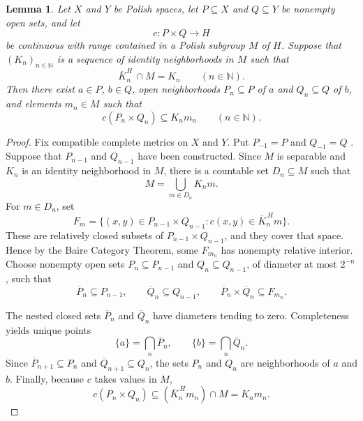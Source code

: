 \documentclass[12pt]{amsart}
\newtheorem{lemma}[theorem]{Lemma}
\theoremstyle{definition}
\begin{document}
\begin{lemma}
\label{Lemma:rectangular-fusion} Let $X$ and $Y$ be Polish spaces, let $%
P\subseteq X$ and $Q\subseteq Y$ be nonempty open sets, and let 
\begin{equation*}
c:P\times Q\longrightarrow H
\end{equation*}%
be continuous with range contained in a Polish subgroup $M$ of $H$. Suppose
that $(K_{n})_{n\in \mathbb{N}}$ is a sequence of identity neighborhoods in $%
M$ such that 
\begin{equation*}
\overline{K}_{n}^{H}\,\cap M=K_{n}\qquad (n\in \mathbb{N}).
\end{equation*}%
Then there exist $a\in P$, $b\in Q$, open neighborhoods $P_{n}\subseteq P$
of $a$ and $Q_{n}\subseteq Q$ of $b$, and elements $m_{n}\in M$ such that 
\begin{equation*}
c(P_{n}\times Q_{n})\subseteq K_{n}m_{n}\qquad (n\in \mathbb{N}).
\end{equation*}
\end{lemma}

\begin{proof}
Fix compatible complete metrics on $X$ and $Y$. Put $P_{-1}=P$ and $Q_{-1}=Q$%
. Suppose that $P_{n-1}$ and $Q_{n-1}$ have been constructed. Since $M$ is
separable and $K_{n}$ is an identity neighborhood in $M$, there is a
countable set $D_{n}\subseteq M$ such that 
\begin{equation*}
M=\bigcup_{m\in D_{n}}K_{n}m.
\end{equation*}%
For $m\in D_{n}$, set 
\begin{equation*}
F_{m}=\{(x,y)\in P_{n-1}\times Q_{n-1}:c(x,y)\in \overline{K}_{n}^{\,H}m\}.
\end{equation*}%
These are relatively closed subsets of $P_{n-1}\times Q_{n-1}$, and they
cover that space. Hence by the Baire Category Theorem, some $F_{m_{n}}$ has
nonempty relative interior. Choose nonempty open sets $P_{n}\subseteq
P_{n-1} $ and $Q_{n}\subseteq Q_{n-1}$, of diameter at most $2^{-n}$, such
that 
\begin{equation*}
\overline{P}_{n}\subseteq P_{n-1},\qquad \overline{Q}_{n}\subseteq
Q_{n-1},\qquad \overline{P}_{n}\times \overline{Q}_{n}\subseteq F_{m_{n}}.
\end{equation*}

The nested closed sets $\overline{P}_{n}$ and $\overline{Q}_{n}$ have
diameters tending to zero. Completeness yields unique points 
\begin{equation*}
\{a\}=\bigcap_{n}\overline{P}_{n},\qquad \{b\}=\bigcap_{n}\overline{Q}_{n}.
\end{equation*}%
Since $\overline{P}_{n+1}\subseteq P_{n}$ and $\overline{Q}_{n+1}\subseteq
Q_{n}$, the sets $P_{n}$ and $Q_{n}$ are neighborhoods of $a$ and $b$.
Finally, because $c$ takes values in $M$, 
\begin{equation*}
c(P_{n}\times Q_{n})\subseteq (\overline{K}_{n}^{\,H}m_{n})\cap M=K_{n}m_{n}.
\end{equation*}
\end{proof}
\end{document}
